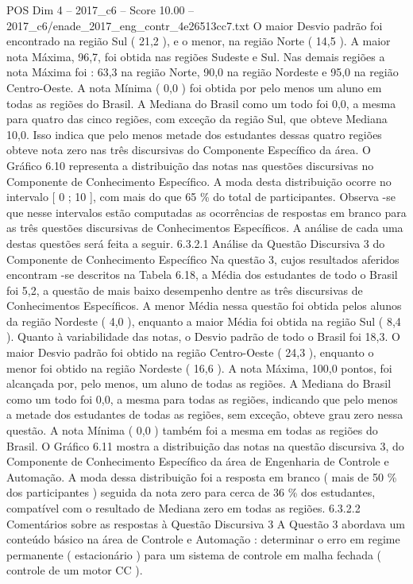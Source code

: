 \begin{textsample}{POS Dim 4 – 2017\_c6 – Score 10.00 – 2017\_c6/enade\_2017\_eng\_contr\_4e26513cc7.txt}
O maior Desvio padrão foi encontrado na região Sul ( 21,2 ), e o menor, na região Norte ( 14,5 ).
A maior nota Máxima, 96,7, foi obtida nas regiões Sudeste e Sul.
Nas demais regiões a nota Máxima foi : 63,3 na região Norte, 90,0 na região Nordeste e 95,0 na região Centro-Oeste.
A nota Mínima ( 0,0 ) foi obtida por pelo menos um aluno em todas as regiões do Brasil.
A Mediana do Brasil como um todo foi 0,0, a mesma para quatro das cinco regiões, com exceção da região Sul, que obteve Mediana 10,0.
Isso indica que pelo menos metade dos estudantes dessas quatro regiões obteve nota zero nas três discursivas do Componente Específico da área.
O Gráfico 6.10 representa a distribuição das notas nas questões discursivas no Componente de Conhecimento Específico.
A moda desta distribuição ocorre no intervalo [ 0 ; 10 ], com mais do que 65 \% do total de participantes.
Observa -se que nesse intervalos estão computadas as ocorrências de respostas em branco para as três questões discursivas de Conhecimentos Específicos.
A análise de cada uma destas questões será feita a seguir. 6.3.2.1 Análise da Questão Discursiva 3 do Componente de Conhecimento Específico Na questão 3, cujos resultados aferidos encontram -se descritos na Tabela 6.18, a Média dos estudantes de todo o Brasil foi 5,2, a questão de mais baixo desempenho dentre as três discursivas de Conhecimentos Específicos.
A menor Média nessa questão foi obtida pelos alunos da região Nordeste ( 4,0 ), enquanto a maior Média foi obtida na região Sul ( 8,4 ).
Quanto à variabilidade das notas, o Desvio padrão de todo o Brasil foi 18,3.
O maior Desvio padrão foi obtido na região Centro-Oeste ( 24,3 ), enquanto o menor foi obtido na região Nordeste ( 16,6 ).
A nota Máxima, 100,0 pontos, foi alcançada por, pelo menos, um aluno de todas as regiões.
A Mediana do Brasil como um todo foi 0,0, a mesma para todas as regiões, indicando que pelo menos a metade dos estudantes de todas as regiões, sem exceção, obteve grau zero nessa questão.
A nota Mínima ( 0,0 ) também foi a mesma em todas as regiões do Brasil.
O Gráfico 6.11 mostra a distribuição das notas na questão discursiva 3, do Componente de Conhecimento Específico da área de Engenharia de Controle e Automação.
A moda dessa distribuição foi a resposta em branco ( mais de 50 \% dos participantes ) seguida da nota zero para cerca de 36 \% dos estudantes, compatível com o resultado de Mediana zero em todas as regiões. 6.3.2.2 Comentários sobre as respostas à Questão Discursiva 3 A Questão 3 abordava um conteúdo básico na área de Controle e Automação : determinar o erro em regime permanente ( estacionário ) para um sistema de controle em malha fechada ( controle de um motor CC ).

\end{textsample}
